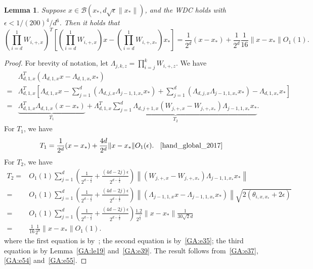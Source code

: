 \documentclass[11pt]{article}
\newtheorem{lemma}[theorem]{Lemma}
\begin{document}

\begin{lemma}\label{GA:le8}
Suppose $x \in \mathcal{B}(x_*, d \sqrt{\epsilon} \|x_*\|)$, and
the WDC
holds with $\epsilon < 1/ (200)^4 / d^6$.  Then it holds that
\begin{equation*}
\left(\prod_{i = d}^1 W_{i, +, x}\right)^T\left[\left(\prod_{i = d}^1 W_{i, +, x}\right) x - \left(\prod_{i = d}^1 W_{i, +, x_*}\right) x_*\right] = \frac{1}{2^d} (x - x_*) + \frac{1}{2^d} \frac{1}{16} \|x - x_*\| O_1(1).
\end{equation*}
\end{lemma}
\begin{proof}
For brevity of notation, let $\Lambda_{j, k, z} = \prod_{i = j}^k W_{i, +, z}$.
We have
\begin{align}
&\Lambda_{d, 1, x}^T\left(\Lambda_{d, 1, x} x - \Lambda_{d, 1, x_*} x_*\right) \nonumber \\
=& \Lambda_{d, 1, x}^T\left[\Lambda_{d, 1, x} x - \sum_{j = 1}^d \left(\Lambda_{d, j, x} \Lambda_{j-1, 1, x_*} x_*\right)\right. + \left.\sum_{j = 1}^d \left(\Lambda_{d, j, x} \Lambda_{j-1, 1, x_*} x_*\right) - \Lambda_{d, 1, x_*} x_*\right] \nonumber \\
=& \underbrace{\Lambda_{d, 1, x}^T \Lambda_{d, 1, x} (x - x_*)}_{T_1} + \underbrace{\Lambda_{d, 1, x}^T \sum_{j = 1}^d \Lambda_{d, j + 1, x} \left( W_{j, +, x} - W_{j, +, x_*} \right) \Lambda_{j-1, 1, x_*} x_*}_{T_2}. \label{GA:e37}
\end{align}
For $T_1$, we have
\begin{align} \label{GA:e54}
T_1 = \frac{1}{2^d} (x - x_*) + \frac{4 d} {2^d} \|x - x_*\| O_1(\epsilon). \;\; \hbox{ \cite[(10)]{hand_global_2017}}
\end{align}
For $T_2$, we have
\begin{align}
T_2 =& O_1(1) \sum_{j = 1}^d \left( \frac{1}{2^{d - \frac{j}{2}}} + \frac{(4d - 2j)\epsilon}{2^{d - \frac{j}{2}}} \right) \left\|(W_{j, +, x} - W_{j, +, x_*}) \Lambda_{j-1, 1, x_*}x_* \right\| \nonumber \\
=& O_1(1) \sum_{j = 1}^d \left( \frac{1}{2^{d - \frac{j}{2}}} + \frac{(4d - 2j)\epsilon}{2^{d - \frac{j}{2}}} \right) \left\|(\Lambda_{j-1, 1, x} x - \Lambda_{j-1, 1, x_*} x_*) \right\| \sqrt{2 (\theta_{i, x, x_*} + 2 \epsilon)} \nonumber \\
=& O_1(1) \sum_{j = 1}^d \left( \frac{1}{2^{d - \frac{j}{2}}} + \frac{(4d - 2j)\epsilon}{2^{d - \frac{j}{2}}} \right) \frac{1.2}{2^{\frac{j}{2}}} \|x - x_*\| \frac{1}{ 30 \sqrt{2} d} \nonumber \\
=& \frac{1}{16} \frac{1}{2^d} \|x - x_*\| O_1(1). \label{GA:e55}
\end{align}
where the first equation is by~\cite[(10)]{hand_global_2017}; the second equation is by~\eqref{GA:e35}; the third equation is by Lemma~\ref{GA:le19} and~\eqref{GA:e39}. The result follows from~\eqref{GA:e37}, \eqref{GA:e54} and~\eqref{GA:e55}.
\end{proof}
\end{document}
